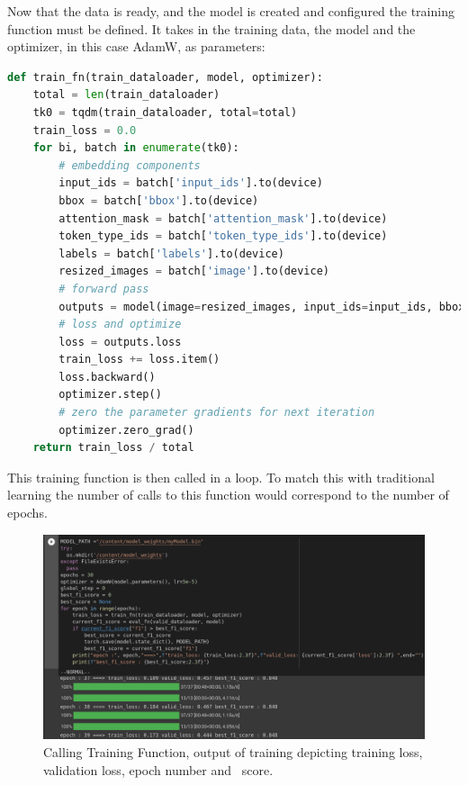 Now that the data is ready, and the model is created and configured the training function must be defined. It takes in
the training data, the model and the optimizer, in this case AdamW, as parameters:
\begin{lstlisting}[language=python, label={lst:train_function}, caption={Training Function.}]
def train_fn(train_dataloader, model, optimizer):
    total = len(train_dataloader)
    tk0 = tqdm(train_dataloader, total=total)
    train_loss = 0.0
    for bi, batch in enumerate(tk0):
        # embedding components
        input_ids = batch['input_ids'].to(device)
        bbox = batch['bbox'].to(device)
        attention_mask = batch['attention_mask'].to(device)
        token_type_ids = batch['token_type_ids'].to(device)
        labels = batch['labels'].to(device)
        resized_images = batch['image'].to(device)
        # forward pass
        outputs = model(image=resized_images, input_ids=input_ids, bbox=bbox, attention_mask=attention_mask, token_type_ids=token_type_ids, labels=labels)
        # loss and optimize
        loss = outputs.loss
        train_loss += loss.item()
        loss.backward()
        optimizer.step()
        # zero the parameter gradients for next iteration
        optimizer.zero_grad()
    return train_loss / total
\end{lstlisting}
This training function is then called in a loop. To match this with traditional learning 
the number of calls to this function would correspond to the number of epochs. 
\begin{figure}[H]
	\centering
	\includegraphics[width=1\textwidth]{figures/call_training_show_output.png}
	\caption{Calling Training Function, output of training depicting training loss, validation loss, epoch number
		and \FO\ score.}
	\label{fig:call_training_show_output}
\end{figure}
